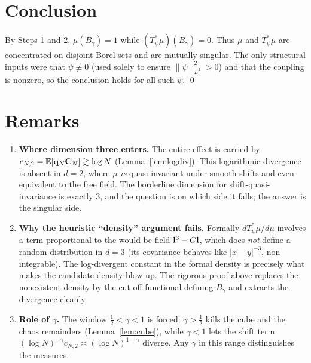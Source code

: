 \documentclass[11pt]{article}
\begin{document}
\section*{Conclusion}

By Steps 1 and 2, $\mu(B_\gamma)=1$ while $(T_\psi^*\mu)(B_\gamma)=0$. Thus $\mu$
and $T_\psi^*\mu$ are concentrated on disjoint Borel sets and are mutually
singular. The only structural inputs were that $\psi\not\equiv0$ (used solely to
ensure $\|\psi\|_{L^2}^2>0$) and that the coupling is nonzero, so the conclusion
holds for all such $\psi$. \qed

\section*{Remarks}

\begin{enumerate}\setlength\itemsep{4pt}
\item \textbf{Where dimension three enters.} The entire effect is carried by
$c_{N,2}=\mathbb{E}[\mathbf{q}_N\mathbf{C}_N]\gtrsim\log N$ (Lemma~\ref{lem:logdiv}). This logarithmic
divergence is absent in $d=2$, where $\mu$ \emph{is} quasi-invariant under smooth
shifts and even equivalent to the free field. The borderline dimension for
shift-quasi-invariance is exactly $3$, and the question is on which side it falls;
the answer is the singular side.

\item \textbf{Why the heuristic ``density'' argument fails.} Formally
$dT_\psi^*\mu/d\mu$ involves a term proportional to the would-be field
$\mathbf{l}^3-C\mathbf{l}$, which does \emph{not} define a random distribution in $d=3$ (its
covariance behaves like $|x-y|^{-3}$, non-integrable). The log-divergent constant
in the formal density is precisely what makes the candidate density blow up. The
rigorous proof above replaces the nonexistent density by the cut-off functional
defining $B_\gamma$ and extracts the divergence cleanly.

\item \textbf{Role of $\gamma$.} The window $\tfrac12<\gamma<1$ is forced:
$\gamma>\tfrac12$ kills the cube and the chaos remainders (Lemma~\ref{lem:cube}),
while $\gamma<1$ lets the shift term $(\log N)^{-\gamma}c_{N,2}\asymp(\log
N)^{1-\gamma}$ diverge. Any $\gamma$ in this range distinguishes the measures.
\end{enumerate}
\end{document}

